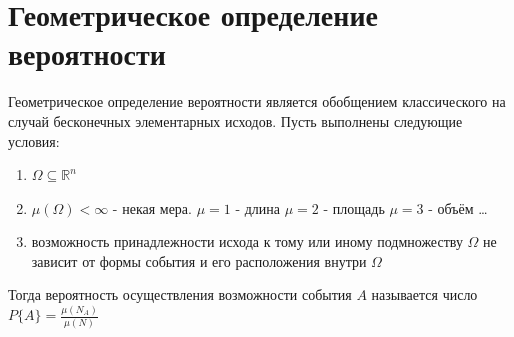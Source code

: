 \documentclass[a4paper, 14pt]{report}
\theoremstyle{definition}
\begin{document}
	\section{Геометрическое определение вероятности}
		Геометрическое определение вероятности является обобщением классического на случай бесконечных элементарных исходов. Пусть выполнены следующие условия:
		\begin{enumerate}
			\item $\Omega\subseteq\mathbb{R}^n$
			\item $\mu(\Omega)<\infty$ - некая мера. 
				\subitem $\mu=1$ - длина
				\subitem $\mu=2$ - площадь
				\subitem $\mu=3$ - объём
				\subitem \dots
			\item возможность принадлежности исхода к тому или иному подмножеству $\Omega$ не зависит от формы события и его расположения внутри $\Omega$
		\end{enumerate}
	
		Тогда вероятность осуществления возможности события $A$ называется число $P\{A\} = \frac{\mu(N_A)}{\mu(N)}$
		
\end{document}
